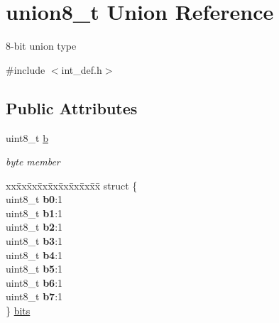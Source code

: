 \hypertarget{unionunion8__t}{\section{union8\+\_\+t Union Reference}
\label{unionunion8__t}
}


8-\/bit union type  




{\ttfamily \#include $<$int\+\_\+def.\+h$>$}

\subsection*{Public Attributes}
\begin{DoxyCompactItemize}
\item 
\hypertarget{unionunion8__t_aeac77ec2a46c80da8263e0bd19182b40}{uint8\+\_\+t \hyperlink{unionunion8__t_aeac77ec2a46c80da8263e0bd19182b40}{b}}\label{unionunion8__t_aeac77ec2a46c80da8263e0bd19182b40}

\begin{DoxyCompactList}\small\item\em byte member \end{DoxyCompactList}\item 
\hypertarget{unionunion8__t_a6846896e6bcddce04deb3820167d9bf0}{\begin{tabbing}
xx\=xx\=xx\=xx\=xx\=xx\=xx\=xx\=xx\=\kill
struct \{\\
\hypertarget{structunion8__t_1_1@0_ac89d8fe3fb13fb280d249c6fe2a90e8f}{\>uint8\_t {\bfseries b0}:1\\
\hypertarget{structunion8__t_1_1@0_a62324dc0648b80bf430b31df4de400d3}{\>uint8\_t {\bfseries b1}:1\\
\hypertarget{structunion8__t_1_1@0_a976f83a8ec9c91ca5c5b3f0df826f629}{\>uint8\_t {\bfseries b2}:1\\
\hypertarget{structunion8__t_1_1@0_a6e3cb0201e8c0ce51da78ea9627c55ac}{\>uint8\_t {\bfseries b3}:1\\
\hypertarget{structunion8__t_1_1@0_aa59df91449aa2c2f94d94f7db167e2e2}{\>uint8\_t {\bfseries b4}:1\\
\hypertarget{structunion8__t_1_1@0_a987216c85371772e451d57cccf42d709}{\>uint8\_t {\bfseries b5}:1\\
\hypertarget{structunion8__t_1_1@0_a34753b0e9678210b3af0fed13340a7a8}{\>uint8\_t {\bfseries b6}:1\\
\hypertarget{structunion8__t_1_1@0_a0fe151083425820cb4a6f67b70cfe090}{\>uint8\_t {\bfseries b7}:1\\
\} \hyperlink{unionunion8__t_a6846896e6bcddce04deb3820167d9bf0}{bits}}\label{unionunion8__t_a6846896e6bcddce04deb3820167d9bf0}
\\

}}}}}}}
\end{tabbing}}
\end{DoxyCompactItemize}
